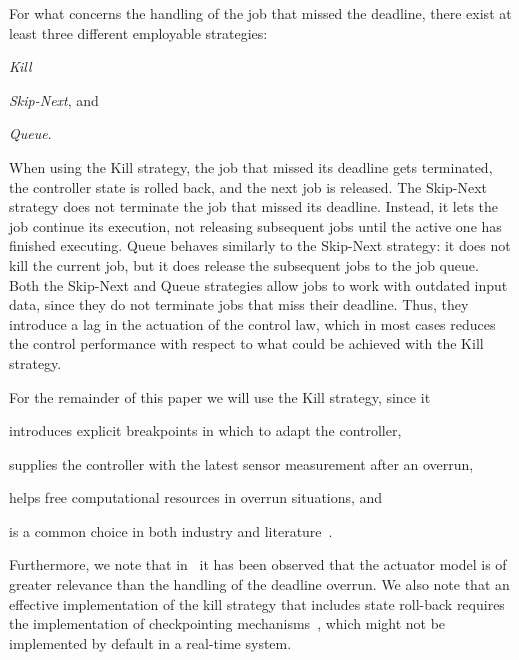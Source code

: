 For what concerns the handling of the job that missed the deadline, there exist at least three different employable strategies:
\begin{enumerate*}[label=(\alph*)] %
    \item \emph{Kill}
    \item \emph{Skip-Next}, and 
    \item \emph{Queue}.
\end{enumerate*}
When using the Kill strategy, the job that missed its deadline gets terminated, the controller state is rolled back, and the next job is released. 
The Skip-Next strategy does not terminate the job that missed its deadline. 
Instead, it lets the job continue its execution, not releasing subsequent jobs until the active one has finished executing.
Queue behaves similarly to the Skip-Next strategy: it does not kill the current job, but it does release the subsequent jobs to the job queue.
Both the Skip-Next and Queue strategies allow jobs to work with outdated input data, since they do not terminate jobs that miss their deadline.
Thus, they introduce a lag in the actuation of the control law, which in most cases reduces the control performance with respect to what could be achieved with the Kill strategy.

For the remainder of this paper we will use the Kill strategy, since it
\begin{enumerate*}[label=(\alph*)]
    \item introduces explicit breakpoints in which to adapt the controller,
    \item supplies the controller with the latest sensor measurement after an overrun,
    \item helps free computational resources in overrun situations, and
    \item is a common choice in both industry and literature~\cite{akesson:2020, Bernat:2001, Hertneck:2019}.
\end{enumerate*}
Furthermore, we note that in~\cite{Vreman:2021ecrts} it has been observed that the actuator model is of greater relevance than the handling of the deadline overrun.
We also note that an effective implementation of the kill strategy that includes state roll-back requires the implementation of checkpointing mechanisms~\cite{Zhang:2003,Seong:2001}, which might not be implemented by default in a real-time system.

